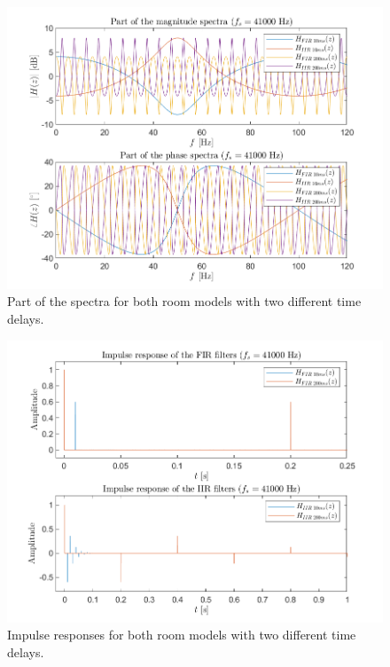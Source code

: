 \documentclass[journal]{IEEEtran}
\begin{document}
\begin{figure}
    \centering
    \includegraphics[width=\linewidth]{assignment_01/plots/bounce_spectra.png}
    \caption{Part of the spectra for both room models with two different time delays.}
    \label{fig:bounce:spectra}
\end{figure}
\begin{figure}
    \centering
    \includegraphics[width=\linewidth]{assignment_01/plots/bonuce_impulse.png}
    \caption{Impulse responses for both room models with two different time delays.}
    \label{fig:bounce:impulse}
\end{figure}
\end{document}
